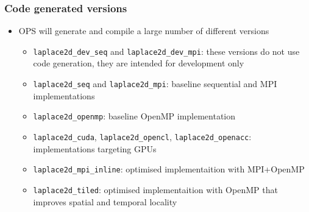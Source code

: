 \documentclass{beamer}
\begin{document}
\begin{frame}[fragile]
\frametitle{Code generated versions}
\begin{itemize}
\item OPS will generate and compile a large number of different versions
\begin{itemize}
  \item \texttt{laplace2d\_dev\_seq} and \texttt{laplace2d\_dev\_mpi}: these versions do not use code generation, they are intended for development only
  \item \texttt{laplace2d\_seq} and \texttt{laplace2d\_mpi}: baseline sequential and MPI implementations
  \item \texttt{laplace2d\_openmp}: baseline OpenMP implementation
  \item \texttt{laplace2d\_cuda}, \texttt{laplace2d\_opencl}, \texttt{laplace2d\_openacc}: implementations targeting GPUs
  \item \texttt{laplace2d\_mpi\_inline}: optimised implementaition with MPI+OpenMP
  \item \texttt{laplace2d\_tiled}: optimised implementaition with OpenMP that improves spatial and temporal locality
\end{itemize}
\end{itemize}
\end{frame}
\end{document}
